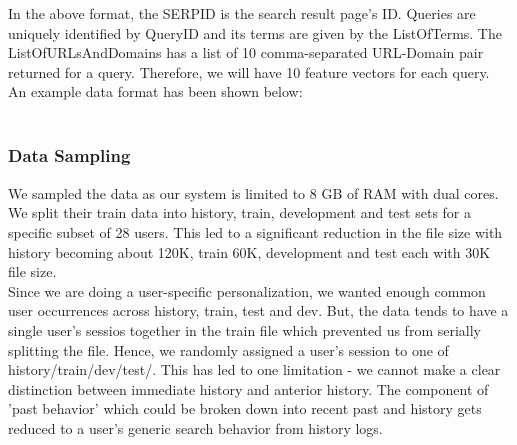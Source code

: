 \documentclass[11pt,letterpaper]{article}
\begin{document}
In the above format, the SERPID is the search result page's ID. Queries are uniquely identified by QueryID and its terms are given by the ListOfTerms. The ListOfURLsAndDomains has a list of 10 comma-separated URL-Domain pair returned for a query. Therefore, we will have 10 feature vectors for each query.
\\An example data format has been shown below:\\

\\
\subsubsection{Data Sampling}
We sampled the data as our system is limited to 8 GB of RAM with dual cores. We split their train data into history, train, development and test sets for a specific subset of 28 users. This led to a significant reduction in the file size with history becoming about 120K, train 60K, development and test each with 30K file size.\\ Since we are doing a user-specific personalization, we wanted enough common user occurrences across history, train, test and dev. But, the data tends to have a single user's sessios together in the train file which prevented us from serially splitting the file. Hence, we randomly assigned a user's session to one of history/train/dev/test/. This has led to one limitation - we cannot make a clear distinction between immediate history and anterior history. The component of 'past behavior' which could be broken down into recent past and history gets reduced to a user's generic search behavior from history logs.\\
\end{document}
